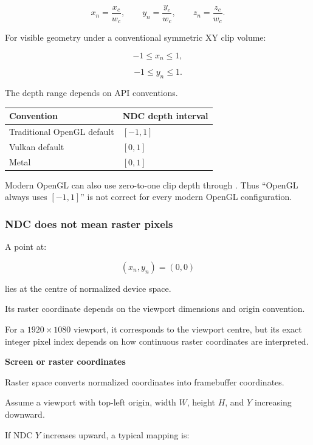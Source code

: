 \[
 \boxed{ x_n=\frac{x_c}{w_c}, \qquad y_n=\frac{y_c}{w_c}, \qquad z_n=\frac{z_c}{w_c} }.
\]

For visible geometry under a conventional symmetric XY clip volume:

\[
 -1\le x_n\le1,
\]

\[
 -1\le y_n\le1.
\]

The depth range depends on API conventions.

{\def\LTcaptype{none} %
\begin{longtable}[]{@{}ll@{}}
\toprule\noalign{}
Convention & NDC depth interval \\
\midrule\noalign{}
\endhead
\bottomrule\noalign{}
\endlastfoot
Traditional OpenGL default & \([-1,1]\) \\
Vulkan default & \([0,1]\) \\
Metal & \([0,1]\) \\
\end{longtable}
}

Modern OpenGL can also use zero-to-one clip depth through . Thus ``OpenGL always uses \([-1,1]\)'' is not correct for every modern OpenGL configuration. 

\subsubsection{NDC does not mean raster pixels}\label{02-foundations-ii-ch032-ndc-does-not-mean-raster-pixels}

\hypertarget{02-foundations-ii-ch032-ndc-does-not-mean-raster-pixels}{}

A point at:

\[
 (x_n,y_n)=(0,0)
\]

lies at the centre of normalized device space.

Its raster coordinate depends on the viewport dimensions and origin convention.

For a \(1920\times1080\) viewport, it corresponds to the viewport centre, but its exact integer pixel index depends on how continuous raster coordinates are interpreted.

\textbf{Screen or raster coordinates}

Raster space converts normalized coordinates into framebuffer coordinates.

Assume a viewport with top-left origin, width \(W\), height \(H\), and \(Y\) increasing downward.

If NDC \(Y\) increases upward, a typical mapping is:

